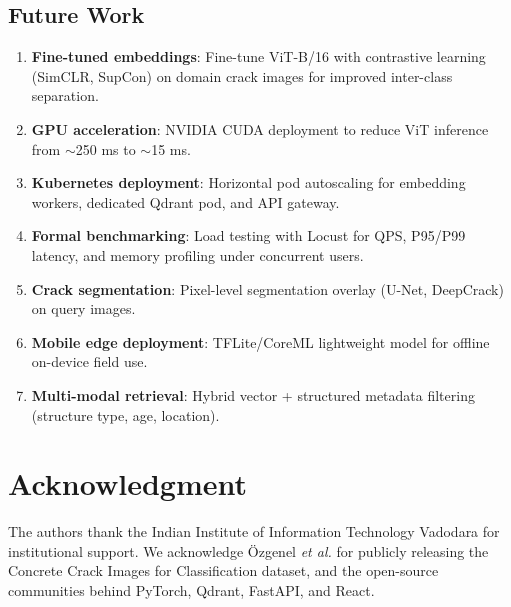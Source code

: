 \documentclass[conference]{IEEEtran}
\begin{document}
\subsection{Future Work}

\begin{enumerate}[leftmargin=*, label=\arabic*)]
  \item \textbf{Fine-tuned embeddings}: Fine-tune ViT-B/16 with contrastive learning (SimCLR, SupCon) on domain crack images for improved inter-class separation.
  \item \textbf{GPU acceleration}: NVIDIA CUDA deployment to reduce ViT inference from $\sim$250 ms to $\sim$15 ms.
  \item \textbf{Kubernetes deployment}: Horizontal pod autoscaling for embedding workers, dedicated Qdrant pod, and API gateway.
  \item \textbf{Formal benchmarking}: Load testing with Locust for QPS, P95/P99 latency, and memory profiling under concurrent users.
  \item \textbf{Crack segmentation}: Pixel-level segmentation overlay (U-Net, DeepCrack) on query images.
  \item \textbf{Mobile edge deployment}: TFLite/CoreML lightweight model for offline on-device field use.
  \item \textbf{Multi-modal retrieval}: Hybrid vector + structured metadata filtering (structure type, age, location).
\end{enumerate}

\section*{Acknowledgment}
The authors thank the Indian Institute of Information Technology Vadodara for institutional support. We acknowledge \"{O}zgenel \textit{et al.} \cite{ref_dataset} for publicly releasing the Concrete Crack Images for Classification dataset, and the open-source communities behind PyTorch, Qdrant, FastAPI, and React.
\end{document}

